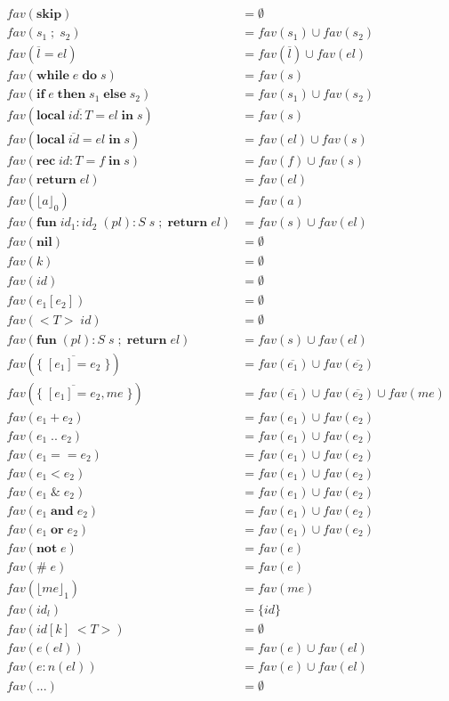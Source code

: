 \begin{align*}
fav(\mathbf{skip}) & = \emptyset\\
fav(s_{1} \;;\; s_{2}) & = fav(s_{1}) \cup fav(s_{2})\\
fav(\overline{l} = el) & = fav(\overline{l}) \cup fav(el)\\
fav(\mathbf{while} \; e \; \mathbf{do} \; s) & = fav(s)\\
fav(\mathbf{if} \; e \; \mathbf{then} \; s_{1} \; \mathbf{else} \; s_{2}) & = fav(s_{1}) \cup fav(s_{2})\\
fav(\mathbf{local} \; \overline{id{:}T} = el \; \mathbf{in} \; s) & = fav(s)\\
fav(\mathbf{local} \; \overline{id} = el \; \mathbf{in} \; s) & = fav(el) \cup fav(s)\\
fav(\mathbf{rec} \; id{:}T = f \; \mathbf{in} \; s) & = fav(f) \cup fav(s)\\
fav(\mathbf{return} \; el) & = fav(el)\\
fav(\lfloor a \rfloor_{0}) & = fav(a)\\
fav(\mathbf{fun} \; id_{1}{:}id_{2} \; (pl){:}S \; s \;;\; \mathbf{return} \; el) & = fav(s) \cup fav(el)\\
fav(\mathbf{nil}) & = \emptyset\\
fav(k) & = \emptyset\\
fav(id) & = \emptyset\\
fav(e_{1}[e_{2}]) & = \emptyset\\
fav({<}T{>} \; id) & = \emptyset\\
fav(\mathbf{fun} \; (pl){:}S \; s \;;\; \mathbf{return} \; el) & = fav(s) \cup fav(el)\\
fav(\{ \; \overline{[e_{1}] = e_{2}} \; \}) & = fav(\overline{e_{1}}) \cup fav(\overline{e_{2}})\\
fav(\{ \; \overline{[e_{1}] = e_{2}},me \; \}) & = fav(\overline{e_{1}}) \cup fav(\overline{e_{2}}) \cup fav(me)\\
fav(e_{1} + e_{2}) & = fav(e_{1}) \cup fav(e_{2})\\
fav(e_{1} \; {..} \; e_{2}) & = fav(e_{1}) \cup fav(e_{2})\\
fav(e_{1} == e_{2}) & = fav(e_{1}) \cup fav(e_{2})\\
fav(e_{1} < e_{2}) & = fav(e_{1}) \cup fav(e_{2})\\
fav(e_{1} \;\&\; e_{2}) & = fav(e_{1}) \cup fav(e_{2})\\
fav(e_{1} \; \mathbf{and} \; e_{2}) & = fav(e_{1}) \cup fav(e_{2})\\
fav(e_{1} \; \mathbf{or} \; e_{2}) & = fav(e_{1}) \cup fav(e_{2})\\
fav(\mathbf{not} \; e) & = fav(e)\\
fav(\# \; e) & = fav(e)\\
fav(\lfloor me \rfloor_{1}) & = fav(me)\\
fav(id_{l}) & = \{ id \}\\
fav(id[k] \; {<}T{>}) & = \emptyset\\
fav(e(el)) & = fav(e) \cup fav(el)\\
fav(e{:}n(el)) & = fav(e) \cup fav(el)\\
fav({...}) & = \emptyset
\end{align*}

